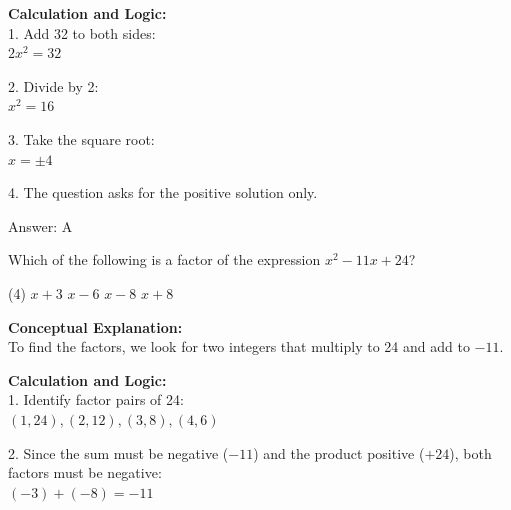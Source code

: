 \documentclass[11pt,paper=a4,answers]{exam}
\begin{document}
\begin{questions}
\begin{solution}
\vspace{15pt}

\textbf{Calculation and Logic:} \\
1. Add 32 to both sides: \\
   $2x^2 = 32$

\vspace{10pt}

2. Divide by 2: \\
   $x^2 = 16$

\vspace{10pt}

3. Take the square root: \\
   $x = \pm 4$

\vspace{10pt}

4. The question asks for the positive solution only.

\vspace{20pt}

Answer: \colorbox{yellow!100}{A}
\end{solution}

\vspace{30pt}

\question
Which of the following is a factor of the expression $x^2 - 11x + 24$?
\begin{tasks}(4)
    \task $x + 3$
    \task $x - 6$
    \task $x - 8$
    \task $x + 8$
\end{tasks}

\begin{solution}
\textbf{Conceptual Explanation:} \\
To find the factors, we look for two integers that multiply to 24 and add to $-11$.

\vspace{15pt}

\textbf{Calculation and Logic:} \\
1. Identify factor pairs of 24: \\
   $(1, 24), (2, 12), (3, 8), (4, 6)$

\vspace{10pt}

2. Since the sum must be negative ($-11$) and the product positive ($+24$), both factors must be negative: \\
   $(-3) + (-8) = -11$

\vspace{10pt}


\end{solution}
\end{questions}
\end{document}

